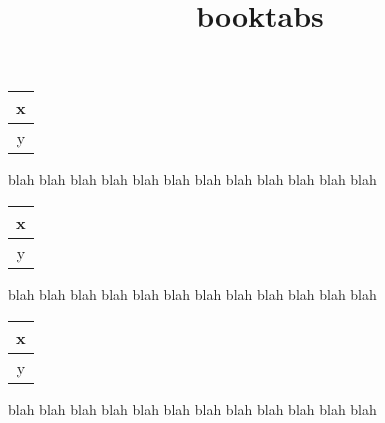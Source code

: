 \documentclass{amsbook}
\title{booktabs}
\begin{document}
\maketitle


\begin{flushleft}
\begin{tabular}{c}
\hline
x\\
\hline
y\\
\hline
\end{tabular}
\end{flushleft}

blah blah blah blah
blah blah blah blah
blah blah blah blah

\begin{flushleft}
\begin{tabular}{c}
\toprule
x\\
\midrule
y\\
\bottomrule
\end{tabular}
\end{flushleft}

blah blah blah blah
blah blah blah blah
blah blah blah blah

\begin{flushleft}
\begin{tabular}{c}
\toprule[1.5pt]
x\\
\midrule
y\\
\bottomrule
\end{tabular}
\end{flushleft}

blah blah blah blah
blah blah blah blah
blah blah blah blah
\end{document}

